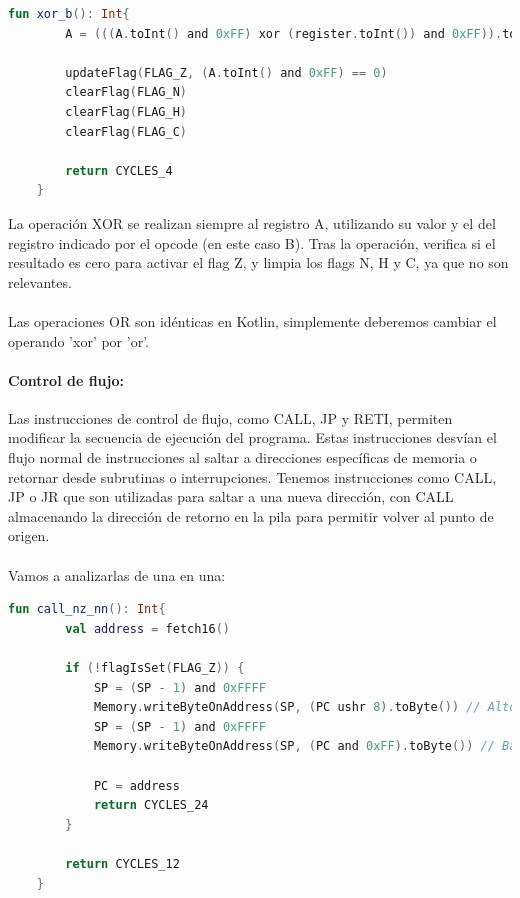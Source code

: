 \begin{lstlisting}[language=Kotlin, caption={Operación XOR}, label={code:kotlinxor}]
    fun xor_b(): Int{
        A = (((A.toInt() and 0xFF) xor (register.toInt()) and 0xFF)).toByte()

        updateFlag(FLAG_Z, (A.toInt() and 0xFF) == 0)
        clearFlag(FLAG_N)
        clearFlag(FLAG_H)
        clearFlag(FLAG_C)
        
        return CYCLES_4
    }
\end{lstlisting}

La operación XOR se realizan siempre al registro A, utilizando su valor y el del registro indicado por el opcode (en este caso B). Tras la operación, verifica si el resultado es cero para activar el flag Z, y limpia los flags N, H y C, ya que no son relevantes.
\\\\
Las operaciones OR son idénticas en Kotlin, simplemente deberemos cambiar el operando 'xor' por 'or'.

\paragraph{Control de flujo:} Las instrucciones de control de flujo, como CALL, JP y RETI, permiten modificar la secuencia de ejecución del programa. Estas instrucciones desvían el flujo normal de instrucciones al saltar a direcciones específicas de memoria o retornar desde subrutinas o interrupciones. Tenemos instrucciones como CALL, JP o JR que son utilizadas para saltar a una nueva dirección, con CALL almacenando la dirección de retorno en la pila para permitir volver al punto de origen.
\\\\
Vamos a analizarlas de una en una:
\begin{lstlisting}[language=Kotlin, caption={Operación CALL}, label={code:kotlincall}]
    fun call_nz_nn(): Int{
        val address = fetch16()

        if (!flagIsSet(FLAG_Z)) {
            SP = (SP - 1) and 0xFFFF
            Memory.writeByteOnAddress(SP, (PC ushr 8).toByte()) // Alto
            SP = (SP - 1) and 0xFFFF
            Memory.writeByteOnAddress(SP, (PC and 0xFF).toByte()) // Bajo
    
            PC = address
            return CYCLES_24
        }

        return CYCLES_12
    }
\end{lstlisting}

